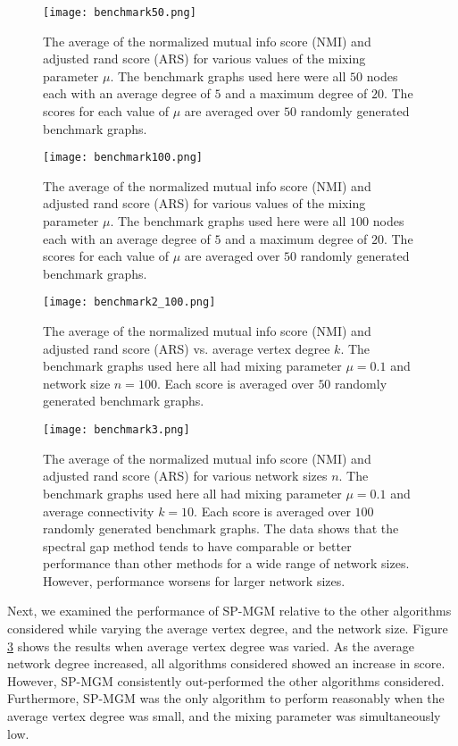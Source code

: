 \documentclass[10pt,journal,compsoc]{IEEEtran} %
\theoremstyle{definition}
\begin{document}
\begin{figure}[htp]
\texttt{[image: benchmark50.png]}
\caption{The average of the normalized mutual info score (NMI) and
adjusted rand score (ARS) for various values of the mixing parameter
$\mu$.  The benchmark graphs used here were all $50$ nodes each with
an average degree of $5$ and a maximum degree of $20$.  The scores for
each value of $\mu$ are averaged over $50$ randomly generated
benchmark graphs.}\label{benchmark50}
\end{figure}
\begin{figure}[htp]
\texttt{[image: benchmark100.png]}
\caption{The average of the normalized mutual info score (NMI) and
adjusted rand score (ARS) for various values of the mixing parameter
$\mu$.  The benchmark graphs used here were all $100$ nodes each with
an average degree of $5$ and a maximum degree of $20$.  The scores for
each value of $\mu$ are averaged over $50$ randomly generated
benchmark graphs.}\label{benchmark100}
\end{figure}
\begin{figure}[htp]
\texttt{[image: benchmark2\_100.png]}
\caption{The average of the normalized mutual info score (NMI) and
adjusted rand score (ARS) vs. average vertex degree $k$.  The
benchmark graphs used here all had mixing parameter $\mu=0.1$ and
network size $n=100$.  Each score is averaged over $50$ randomly
generated benchmark graphs.}\label{benchmark2_100}
\end{figure}
\begin{figure}[htp]
\texttt{[image: benchmark3.png]}
\caption{The average of the normalized mutual info score (NMI) and
adjusted rand score (ARS) for various network sizes $n$.  The
benchmark graphs used here all had mixing parameter $\mu=0.1$ and
average connectivity $k=10$.  Each score is averaged over $100$
randomly generated benchmark graphs.  The data shows that the spectral
gap method tends to have comparable or better performance than other
methods for a wide range of network sizes. However, performance worsens for
larger network sizes.}\label{benchmark3}
\end{figure} 

Next, we examined the performance of SP-MGM relative to the other
algorithms considered while varying the average vertex degree, and the
network size.  Figure \ref{benchmark2_100} shows the results when
average vertex degree was varied. As the average network degree
increased, all algorithms considered showed an increase in score.
However, SP-MGM consistently out-performed the other algorithms
considered.  Furthermore, SP-MGM was the only algorithm to perform
reasonably when the average vertex degree was small, and the mixing
parameter was simultaneously low.
\end{document}
